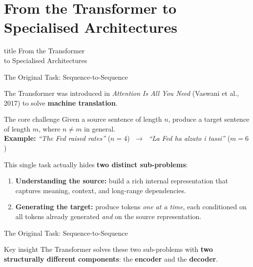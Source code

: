 \documentclass[aspectratio=169]{beamer}
\begin{document}
\section{From the Transformer to Specialised Architectures}
%
\begin{frame}[plain]
  \vfill
  \begin{beamercolorbox}[sep=12pt,center,rounded=true,shadow=true]{title}
    From the Transformer\\to Specialised Architectures
  \end{beamercolorbox}
  \vfill
\end{frame}
%
%
\begin{frame}{The Original Task: Sequence-to-Sequence}

The Transformer was introduced in \emph{Attention Is All You Need}
(Vaswani et al., 2017) to solve \textbf{machine translation}.

\medskip
\begin{block}{The core challenge}
  Given a source sentence of length $n$, produce a target sentence
  of length $m$, where $n \neq m$ in general.\\[4pt]
  \textbf{Example:} \quad
  \textit{``The Fed raised rates''} \;($n{=}4$)
  $\;\longrightarrow\;$
  \textit{``La Fed ha alzato i tassi''} \;($m{=}6$)
\end{block}

\medskip
This single task actually hides \textbf{two distinct sub-problems}:

\begin{enumerate}
  \item \textbf{Understanding the source:} build a rich internal
        representation that captures meaning, context, and
        long-range dependencies.
  \item \textbf{Generating the target:} produce tokens
        \emph{one at a time}, each conditioned on all tokens
        already generated \emph{and} on the source representation.
\end{enumerate}
\end{frame}
%
%
\begin{frame}{The Original Task: Sequence-to-Sequence}
\begin{alertblock}{Key insight}
  The Transformer solves these two sub-problems with \textbf{two
  structurally different components}: the \textbf{encoder} and the
  \textbf{decoder}.
\end{alertblock}

\end{frame}
\end{document}
